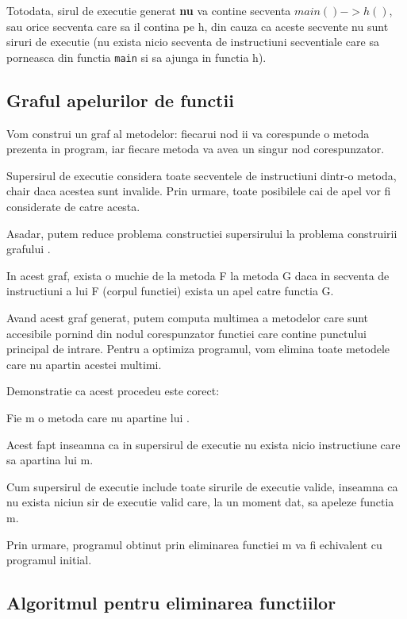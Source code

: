Totodata, sirul de executie generat \textbf{nu} va contine
secventa \(main() -> h()\), sau orice secventa care sa il contina
pe h, din cauza ca aceste secvente nu sunt siruri de executie
(nu exista nicio secventa de instructiuni secventiale
care sa porneasca din functia \texttt{main} si sa ajunga in
functia h).

\subsection{Graful apelurilor de functii}\label{graful_apelurilor}

Vom construi un graf  al metodelor: fiecarui nod ii va
corespunde o metoda prezenta in program, iar fiecare metoda va
avea un singur nod corespunzator.

Supersirul de executie considera toate secventele de instructiuni
dintr-o metoda, chair daca acestea sunt invalide.
Prin urmare, toate posibilele cai de apel vor fi considerate de
catre acesta.

Asadar, putem reduce problema constructiei supersirului la
problema construirii grafului .

In acest graf, exista o muchie de la metoda F la metoda
G daca in secventa de instructiuni a lui F (corpul functiei)
exista un apel catre functia G.

Avand acest graf generat, putem computa multimea  a metodelor
care sunt accesibile pornind din nodul corespunzator functiei care
contine punctului principal de intrare.
Pentru a optimiza programul, vom elimina toate metodele care nu
apartin acestei multimi.

Demonstratie ca acest procedeu este corect:
\begin{lemma}

	Fie m o metoda care nu apartine lui .

	Acest fapt inseamna ca in supersirul de executie nu exista nicio
	instructiune care sa apartina lui m.

	Cum supersirul de executie include toate sirurile de executie
	valide, inseamna ca nu exista niciun sir de executie valid care,
	la un moment dat, sa apeleze functia m.

	Prin urmare, programul obtinut prin eliminarea functiei m va fi
	echivalent cu programul initial.
\end{lemma}

\subsection{Algoritmul pentru eliminarea
functiilor}\label{algoritm_naiv_pentru_eliminare}

